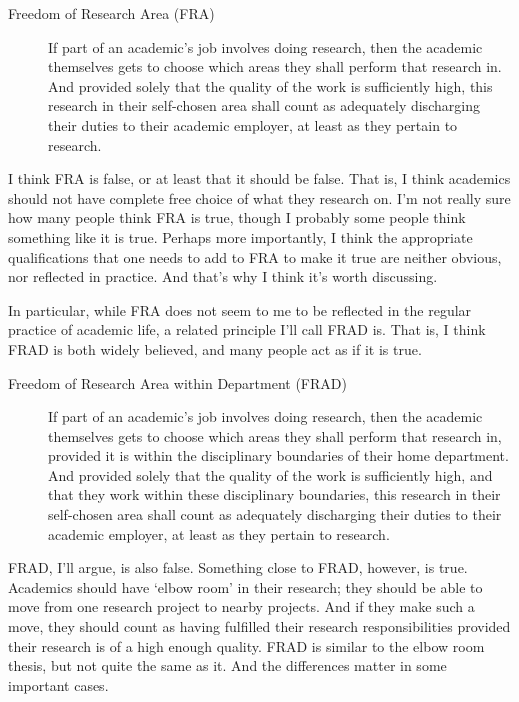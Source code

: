 \documentclass[
  10pt,
  letterpaper,
  DIV=11,
  numbers=noendperiod,
  twoside]{scrartcl}
\begin{document}
\begin{description}
\item[Freedom of Research Area (FRA)]
If part of an academic's job involves doing research, then the academic
themselves gets to choose which areas they shall perform that research
in. And provided solely that the quality of the work is sufficiently
high, this research in their self-chosen area shall count as adequately
discharging their duties to their academic employer, at least as they
pertain to research.
\end{description}

I think FRA is false, or at least that it should be false. That is, I
think academics should not have complete free choice of what they
research on. I'm not really sure how many people think FRA is true,
though I probably some people think something like it is true. Perhaps
more importantly, I think the appropriate qualifications that one needs
to add to FRA to make it true are neither obvious, nor reflected in
practice. And that's why I think it's worth discussing.

In particular, while FRA does not seem to me to be reflected in the
regular practice of academic life, a related principle I'll call FRAD
is. That is, I think FRAD is both widely believed, and many people act
as if it is true.

\begin{description}
\item[Freedom of Research Area within Department (FRAD)]
If part of an academic's job involves doing research, then the academic
themselves gets to choose which areas they shall perform that research
in, provided it is within the disciplinary boundaries of their home
department. And provided solely that the quality of the work is
sufficiently high, and that they work within these disciplinary
boundaries, this research in their self-chosen area shall count as
adequately discharging their duties to their academic employer, at least
as they pertain to research.
\end{description}

FRAD, I'll argue, is also false. Something close to FRAD, however, is
true. Academics should have `elbow room' in their research; they should
be able to move from one research project to nearby projects. And if
they make such a move, they should count as having fulfilled their
research responsibilities provided their research is of a high enough
quality. FRAD is similar to the elbow room thesis, but not quite the
same as it. And the differences matter in some important cases.
\end{document}
